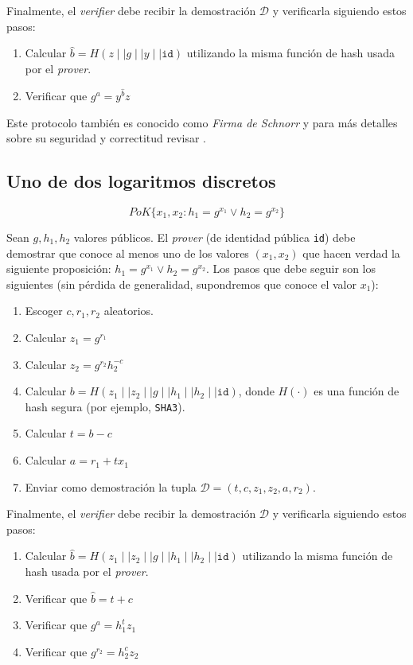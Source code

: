Finalmente, el \emph{verifier} debe recibir la demostración $\mathcal{D}$ y 
verificarla siguiendo estos pasos:
\begin{enumerate}
	\item Calcular $\hat{b} = H(z \mid\mid g \mid\mid y \mid\mid \mathtt{id})$ 
	utilizando la misma función de hash usada por el \emph{prover}.
	\item Verificar que $g^a = y^{\hat{b}} z$
\end{enumerate} 

Este protocolo también es conocido como \emph{Firma de Schnorr} y para más detalles 
sobre su seguridad y correctitud revisar \cite{schnorr1989efficient}.

\subsection{Uno de dos logaritmos discretos}

$$PoK\{x_1, x_2 : h_1 = g^{x_1} \lor h_2 = g^{x_2}\}$$

Sean $g,h_1,h_2$ valores públicos. El \emph{prover} (de identidad pública 
\texttt{id}) debe demostrar que conoce al menos uno de los valores $(x_1,x_2)$ 
que hacen verdad la siguiente proposición: $h_1 = g^{x_1} \lor h_2 = g^{x_2}$. 
Los pasos que debe seguir son los siguientes (sin pérdida de generalidad, 
supondremos que conoce el valor $x_1$):
\begin{enumerate}
	\item Escoger $c, r_1, r_2$ aleatorios.
	\item Calcular $z_1 = g^{r_1}$
	\item Calcular $z_2 = g^{r_2} h_2^{-c}$
	\item Calcular $b = H(z_1 \mid\mid z_2 \mid\mid g \mid\mid h_1 \mid\mid h_2 \mid\mid \mathtt{id})$, donde $H(\cdot)$ es una función de hash segura (por ejemplo, \texttt{SHA3}).
	\item Calcular $t = b - c$
	\item Calcular $a = r_1 + t x_1$
	\item Enviar como demostración la tupla $\mathcal{D} = (t, c, z_1, z_2, a, r_2)$.
\end{enumerate}

Finalmente, el \emph{verifier} debe recibir la demostración $\mathcal{D}$ y 
verificarla siguiendo estos pasos:
\begin{enumerate}
	\item Calcular $\hat{b} = H(z_1 \mid\mid z_2 \mid\mid g \mid\mid h_1 \mid\mid h_2 \mid\mid \mathtt{id})$ utilizando la misma función de hash usada por el \emph{prover}.
	\item Verificar que $\hat{b} = t + c$
	\item Verificar que $g^a = h_1^t z_1$
	\item Verificar que $g^{r_2} = h_2^c z_2$
\end{enumerate} 

